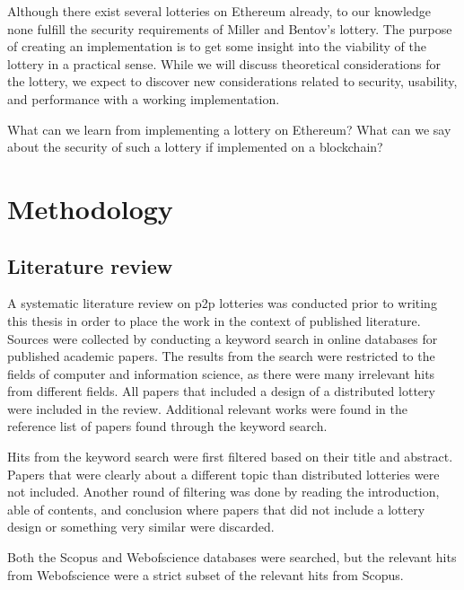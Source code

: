 Although there exist several lotteries on Ethereum already, to our knowledge none fulfill the security requirements of Miller and Bentov's lottery. The purpose of creating an implementation is to get some insight into the viability of the lottery in a practical sense. While we will discuss theoretical considerations for the lottery, we expect to discover new considerations related to security, usability, and performance with a working implementation. 


What can we learn from implementing a lottery on Ethereum? What can we say about the security of such a lottery if implemented on a blockchain?

\section{Methodology}
\label{sec:methodology}

\subsection{Literature review}

A systematic literature review on p2p lotteries was conducted prior to writing this thesis in order to place the work in the context of published literature. Sources were collected by conducting a keyword search in online databases for published academic papers. The results from the search were restricted to the fields of computer and information science, as there were many irrelevant hits from different fields. All papers that included a design of a distributed lottery were included in the review. Additional relevant works were found in the reference list of papers found through the keyword search. 

Hits from the keyword search were first filtered based on their title and abstract. Papers that were clearly about a different topic than distributed lotteries were not included. Another round of filtering was done by reading the introduction, able of contents, and conclusion where papers that did not include a lottery design or something very similar were discarded. 

Both the Scopus and Webofscience databases were searched, but the relevant hits from Webofscience were a strict subset of the relevant hits from Scopus.

